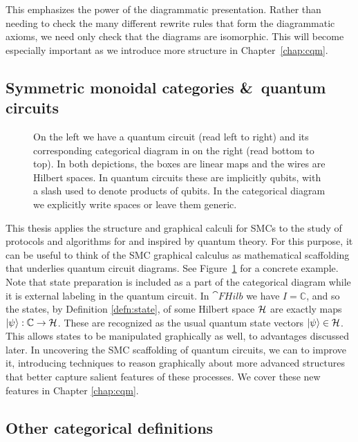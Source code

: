\noindent This emphasizes the power of the diagrammatic presentation.  Rather than needing to check the many different rewrite rules that form the diagrammatic axioms, we need only check that the diagrams are isomorphic.  This will become especially important as we introduce more structure in Chapter~\ref{chap:cqm}.

\subsection{Symmetric monoidal categories \&\ quantum circuits}
\label{sec:smcqc}
\begin{figure}[t]

\caption[Comparison of quantum circuits and symmetric monoidal diagrams]{On the left we have a quantum circuit (read left to right) and its corresponding categorical diagram in  on the right (read bottom to top). In both depictions, the boxes are linear maps and the wires are Hilbert spaces. In quantum circuits these are implicitly qubits, with a slash used to denote products of qubits. In the categorical diagram we explicitly write spaces or leave them generic.}
\label{fig:QCDSMC}
\end{figure}

This thesis applies the structure and graphical calculi for SMCs to the study of protocols and algorithms for and inspired by quantum theory. For this purpose, it can be useful to think of the SMC graphical calculus as mathematical scaffolding that underlies quantum circuit diagrams. See Figure~\ref{fig:QCDSMC} for a concrete example. Note that state preparation is included as a part of the categorical diagram while it is external labeling in the quantum circuit. In $\cat{FHilb}$ we have $I=\mathbb{C}$, and so the states, by Definition \ref{defn:state}, of some Hilbert space $\mathcal{H}$ are exactly maps $| \psi \rangle:\mathbb{C}\to\mathcal{H}$. These are recognized as the usual quantum state vectors $| \psi \rangle\in\mathcal{H}$. This allows states to be manipulated graphically as well, to advantages discussed later. In uncovering the SMC scaffolding of quantum circuits, we can to improve it, introducing techniques to reason graphically about more advanced structures that better capture salient features of these processes. We cover these new features in Chapter \ref{chap:cqm}.

\subsection{Other categorical definitions}

